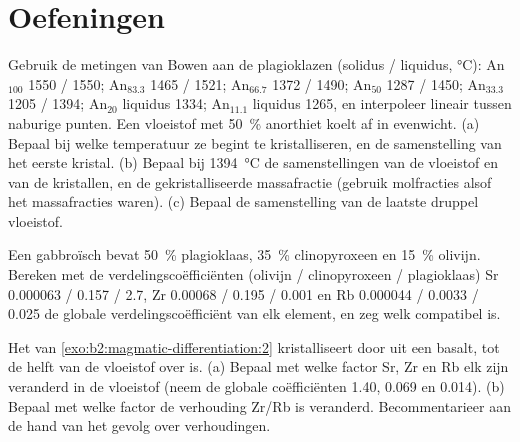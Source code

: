 \section{Oefeningen}

\begin{exercise}[$\star$]\label{exo:b2:magmatic-differentiation:1}
Gebruik de metingen van Bowen aan de plagioklazen (solidus / liquidus, \unit{\celsius}):
An$_{100}$ 1550 / 1550; An$_{83.3}$ 1465 / 1521; An$_{66.7}$ 1372 / 1490; An$_{50}$
1287 / 1450; An$_{33.3}$ 1205 / 1394; An$_{20}$ liquidus 1334; An$_{11.1}$ liquidus
1265, en interpoleer lineair tussen naburige punten. Een vloeistof met
\qty{50}{\percent} anorthiet koelt af in evenwicht. (a) Bepaal bij welke temperatuur ze
begint te kristalliseren, en de samenstelling van het eerste kristal. (b) Bepaal bij
\qty{1394}{\celsius} de samenstellingen van de vloeistof en van de kristallen,
en de gekristalliseerde massafractie (gebruik molfracties alsof het
massafracties waren). (c) Bepaal de samenstelling van de laatste druppel vloeistof.
\end{exercise}

\begin{exercise}[$\star$]\label{exo:b2:magmatic-differentiation:2}
Een gabbroïsch  bevat \qty{50}{\percent} plagioklaas, \qty{35}{\percent}
clinopyroxeen en \qty{15}{\percent} olivijn. Bereken met de verdelingscoëfficiënten
(olivijn / clinopyroxeen / plagioklaas) Sr 0.000063 / 0.157 / 2.7, Zr 0.00068 /
0.195 / 0.001 en Rb 0.000044 / 0.0033 / 0.025 de globale
verdelingscoëfficiënt van elk element, en zeg welk compatibel is.
\end{exercise}

\begin{exercise}[$\star$]\label{exo:b2:magmatic-differentiation:3}
Het  van \cref{exo:b2:magmatic-differentiation:2} kristalliseert door  uit een basalt,
tot de helft van de vloeistof over is. (a) Bepaal met welke factor Sr, Zr en Rb elk zijn veranderd
in de vloeistof (neem de globale coëfficiënten 1.40, 0.069 en 0.014). (b) Bepaal met welke factor
de verhouding Zr/Rb is veranderd. Becommentarieer aan de hand van het gevolg over verhoudingen.
\end{exercise}

